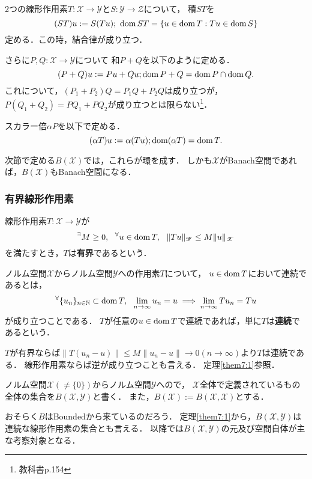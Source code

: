 \documentclass[a4j]{jsarticle}
\newcommand{\spX}{\mathscr{X}}
\newcommand{\spY}{\mathscr{Y}}
\begin{document}
    \begin{Def}
        2つの線形作用素$T:\spX \to \spY$と$S:\spY \to \mathscr{Z}$について，
        積$ST$を
        \[ (ST)u:=S(Tu);~ \operatorname{dom} ST=\{ u \in \operatorname{dom} T : Tu \in \operatorname{dom} S \} \]
        定める．この時，結合律が成り立つ．

        さらに$P, Q:\spX \to \spY$について
        和$P+Q$を以下のように定める．
        \[ (P+Q)u:=Pu+Qu; \operatorname{dom} P+Q=\operatorname{dom} P \cap \operatorname{dom} Q.  \]
        これについて，$(P_1+P_2)Q=P_1 Q+P_2 Q$は成り立つが，
        $P(Q_1+Q_2)=P Q_1+P Q_2$が成り立つとは限らない\footnote{教科書p.154}．

        スカラー倍$\alpha P$を以下で定める．
        \[ (\alpha T)u:=\alpha (Tu); \operatorname{dom} (\alpha T)=\operatorname{dom} T. \]
    \end{Def}
    次節で定める$B(\spX)$では，これらが環を成す．
    しかも$\spX$がBanach空間であれば，$B(\spX)$もBanach空間になる．

    \subsubsection{有界線形作用素}
    \begin{Def}
        線形作用素$T:\spX \to \spY$が
        \[ \Exists{M \geq 0} \Forall{u \in \dom T} \|Tu\|_{\spY} \leq M \|u\|_{\spX} \]
        を満たすとき，$T$は\textbf{有界}であるという．
    \end{Def}

    \begin{Def}
        ノルム空間$\spX$からノルム空間$\spY$への作用素$T$について，
        $u \in \operatorname{dom} T$において連続であるとは，
        \[ {}^{\forall} \{ u_n\}_{n \in \mathbb{N}} \subset \operatorname{dom} T,~~ \lim_{n \to \infty}u_n=u \implies \lim_{n \to \infty}T u_n=Tu  \]
        が成り立つことである．
        $T$が任意の$u \in \operatorname{dom} T$で連続であれば，単に$T$は\textbf{連続}であるという．
    \end{Def}
    $T$が有界ならば$\|T(u_n-u)\| \leq M\|u_n-u\| \to 0(n \to \infty)$より$T$は連続である．
    線形作用素ならば逆が成り立つことも言える．
    定理\ref{them7:1}参照．

    \begin{Def}
        ノルム空間$\spX(\neq \{0\})$からノルム空間$\spY$へので，
        $\spX$全体で定義されているもの全体の集合を$B(\spX, \spY)$と書く．
        また，$B(\spX):=B(\spX, \spX)$とする．
    \end{Def}
    おそらく$B$はBoundedから来ているのだろう．
    定理\ref{them7:1}から，$B(\spX, \spY)$は連続な線形作用素の集合とも言える．
    以降では$B(\spX, \spY)$の元及び空間自体が主な考察対象となる．
\end{document}
